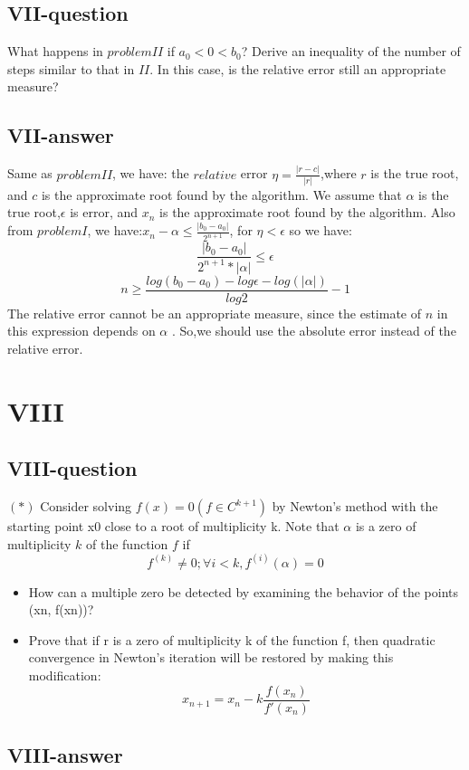 \documentclass[a4paper]{article}
\begin{document}
\subsection*{VII-question}

What happens in $problem II$ if $a_0 < 0 < b_0$? Derive
an inequality of the number of steps similar to that in
$II$. In this case, is the relative error still an appropriate
measure?

\subsection*{VII-answer}
Same as $problem II$, we have: the $relative$ error $\eta = \frac{|r - c|}{|r|} $,where $r$ is the true root, and $c$ is the approximate root found by the algorithm. 
We assume that $\alpha $ is the true root,$\epsilon $ is error, and $x_n$ is the approximate root found by the algorithm.
Also from $problem I$, we have:$x_n-\alpha \leq  \frac{|b_0 - a_0|}{2^{n+1}}$, for $\eta < \epsilon $ so we have:
$$\frac{|b_0 - a_0|}{2^{n+1}*|\alpha |} \leq \epsilon $$
$$ n \geq \frac{log(b_0-a_0)-log\epsilon -log(|\alpha |)}{log2} -1$$
The relative error cannot be an appropriate measure, since the estimate of $n$ in this expression depends on $\alpha $ .
So,we should use the absolute error instead of the relative error.

\section*{VIII}
\subsection*{VIII-question}
$(*)$ Consider solving $f(x) = 0 (f ∈ C^{k+1})$ by Newton's
method with the starting point x0 close to a root of
multiplicity k. Note that $\alpha$  is a zero of multiplicity $k$
of the function $f$ if
$$f^{(k)}\neq 0; \forall i< k, f^{(i)}(\alpha ) = 0$$
\begin{itemize}
    \item How can a multiple zero be detected by examining
    the behavior of the points (xn, f(xn))?
    \item Prove that if r is a zero of multiplicity k of the
    function f, then quadratic convergence in Newton's iteration will be restored by making this
    modification:
    $$x_{n+1}=x_{n}-k\frac{f(x_n)}{f'(x_n)}$$
\end{itemize}

\subsection*{VIII-answer}
\end{document}

